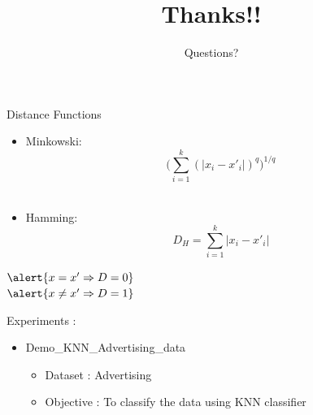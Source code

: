 \documentclass[aspectratio=169,14pt,usenames,dvipsnames]{beamer}
\begin{document}
\begin{frame}{Distance Functions}
\vspace{0.5cm}\centering
\begin{itemize}
	\item \small{Minkowski:      $$ \Bigg(    \sum_{i=1}^k{({|x_i - x'_i|})^q}  \Bigg)^{1/q} $$} \\[5pt]
	\item \small{Hamming:         $$D_H = \sum_{i=1}^k{|x_i - x'_i|} $$}
\end{itemize}	\vspace{0.13cm}     \small{\hspace{1.5cm}$ \alert{ x = x' \Rightarrow D = 0} $}\\ \small{\hspace{1.5cm}$ \alert{x \neq x' \Rightarrow D = 1} $}

\end{frame}


\begin{frame}{Experiments : }
\begin{itemize}
\item {Demo\_KNN\_Advertising\_data} 
	\begin{itemize}
		\item Dataset : Advertising  
		\item Objective : To classify the data using KNN classifier
	\end{itemize}

\end{itemize}
\end{frame}


{ \1
\begin{frame}
	\title{Thanks!!}
	\subtitle{Questions?}
	\maketitle
\end{frame}
}
\end{document}
